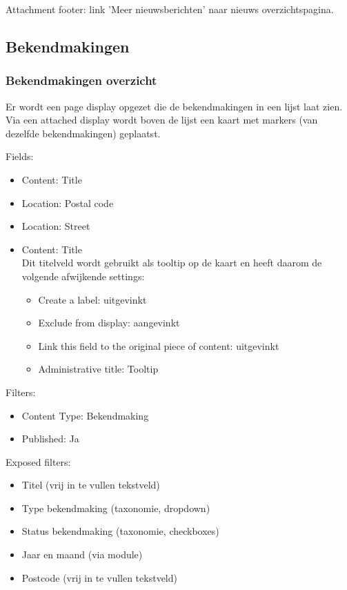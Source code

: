 Attachment footer: link 'Meer nieuwsberichten' naar nieuws overzichtspagina.

\subsection{Bekendmakingen}\label{bekendmakingenview}
\subsubsection{Bekendmakingen overzicht}\label{bekendmakingen-overzicht}

Er wordt een page display opgezet die de bekendmakingen in een lijst laat zien. Via een attached display wordt boven de lijst een kaart met  markers (van dezelfde bekendmakingen) geplaatst.

Fields:
\begin{itemize}
\item Content: Title
\item Location: Postal code
\item Location: Street
\item Content: Title \\
Dit titelveld wordt gebruikt als tooltip op de kaart en heeft daarom de volgende afwijkende settings:
\begin{itemize}
\item Create a label: uitgevinkt
\item Exclude from display: aangevinkt
\item Link this field to the original piece of content: uitgevinkt
\item Administrative title: Tooltip
\end{itemize}
\end{itemize}

Filters:
\begin{itemize}
\item Content Type: Bekendmaking
\item Published: Ja
\end{itemize}

Exposed filters:
\begin{itemize}
\item Titel (vrij in te vullen tekstveld)
\item Type bekendmaking (taxonomie, dropdown)
\item Status bekendmaking (taxonomie, checkboxes)
\item Jaar en maand (via  module)
\item Postcode (vrij in te vullen tekstveld)
\end{itemize}

